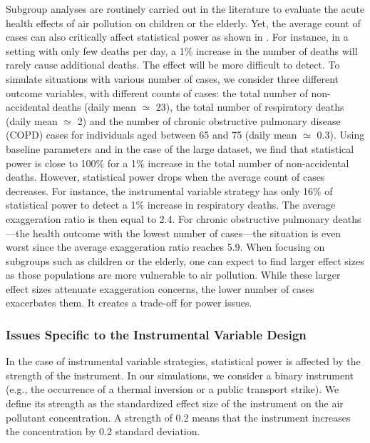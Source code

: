 \documentclass[12pt]{article}
\begin{document}
            Subgroup analyses are routinely carried out in the literature to evaluate the acute health effects of air pollution on children or the elderly. Yet, the average count of cases can also critically affect statistical power as shown in . For instance, in a setting with only few deaths per day, a 1\% increase in the number of deaths will rarely cause additional deaths. The effect will be more difficult to detect. To simulate situations with various number of cases, we consider three different outcome variables, with different counts of cases: the total number of non-accidental deaths (daily mean $\simeq$ 23), the total number of respiratory deaths (daily mean $\simeq$ 2) and the number of chronic obstructive pulmonary disease (COPD) cases for individuals aged between 65 and 75 (daily mean $\simeq$ 0.3). Using baseline parameters and in the case of the large dataset, we find that statistical power is close to 100\% for a 1\% increase in the total number of non-accidental deaths. However, statistical power drops when the average count of cases decreases. For instance, the instrumental variable strategy has only 16\% of statistical power to detect a 1\% increase in respiratory deaths. The average exaggeration ratio is then equal to 2.4. For chronic obstructive pulmonary deaths---the health outcome with the lowest number of cases---the situation is even worst since the average exaggeration ratio reaches 5.9. When focusing on subgroups such as children or the elderly, one can expect to find larger effect sizes as those populations are more vulnerable to air pollution. While these larger effect sizes attenuate exaggeration concerns, the lower number of cases exacerbates them. It creates a trade-off for power issues.

        \subsubsection*{Issues Specific to the Instrumental Variable Design}
        
            In the case of instrumental variable strategies, statistical power is affected by the strength of the instrument. In our simulations, we consider a binary instrument (e.g., the occurrence of a thermal inversion or a public transport strike). We define its strength as the standardized effect size of the instrument on the air pollutant concentration. A strength of 0.2 means that the instrument increases the concentration by 0.2 standard deviation. 
            
\end{document}
